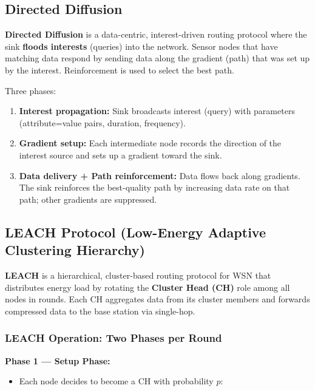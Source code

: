 \documentclass[12pt,a4paper]{article}
\begin{document}
\subsection{Directed Diffusion}

\begin{tcolorbox}[defbox, title={\textbf{Directed Diffusion --- Definition}}]
\textbf{Directed Diffusion} is a data-centric, interest-driven routing protocol where the sink \textbf{floods interests} (queries) into the network. Sensor nodes that have matching data respond by sending data along the gradient (path) that was set up by the interest. Reinforcement is used to select the best path.
\end{tcolorbox}

Three phases:
\begin{enumerate}[leftmargin=*, itemsep=3pt]
  \item \textbf{Interest propagation:} Sink broadcasts interest (query) with parameters (attribute=value pairs, duration, frequency).
  \item \textbf{Gradient setup:} Each intermediate node records the direction of the interest source and sets up a gradient toward the sink.
  \item \textbf{Data delivery + Path reinforcement:} Data flows back along gradients. The sink reinforces the best-quality path by increasing data rate on that path; other gradients are suppressed.
\end{enumerate}

\subsection{LEACH Protocol (Low-Energy Adaptive Clustering Hierarchy)}

\begin{tcolorbox}[defbox, title={\textbf{LEACH --- Definition}}]
\textbf{LEACH} is a hierarchical, cluster-based routing protocol for WSN that distributes energy load by rotating the \textbf{Cluster Head (CH)} role among all nodes in rounds. Each CH aggregates data from its cluster members and forwards compressed data to the base station via single-hop.
\end{tcolorbox}

\subsubsection*{LEACH Operation: Two Phases per Round}

\textbf{Phase 1 --- Setup Phase:}
\begin{itemize}[leftmargin=*, itemsep=2pt]
  \item Each node decides to become a CH with probability $p$:
\end{itemize}
\end{document}
